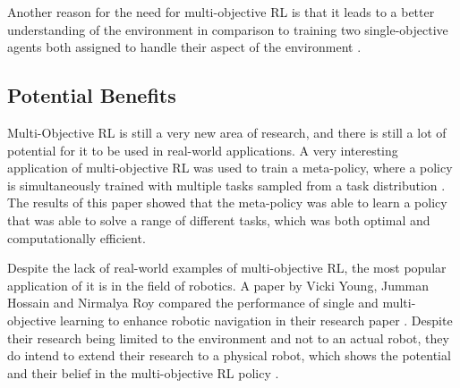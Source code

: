 Another reason for the need for multi-objective RL is that it leads to a better understanding of the environment in comparison to training two single-objective agents both assigned to handle their aspect of the environment \cite{Sutton1}. %


\subsection{Potential Benefits}

Multi-Objective RL is still a very new area of research, and there is still a lot of potential for it to be used in real-world applications. A very interesting application of multi-objective RL was used to train a meta-policy, where a policy is simultaneously trained with multiple tasks sampled from a task distribution \cite{8968092}. The results of this paper showed that the meta-policy was able to learn a policy that was able to solve a range of different tasks, which was both optimal and computationally efficient. 

Despite the lack of real-world examples of multi-objective RL, the most popular application of it is in the field of robotics. A paper by Vicki Young, Jumman Hossain and Nirmalya Roy compared the performance of single and multi-objective learning to enhance robotic navigation in their research paper \cite{young2023enhancing}. Despite their research being limited to the environment and not to an actual robot, they do intend to extend their research to a physical robot, which shows the potential and their belief in the multi-objective RL policy \cite{young2023enhancing}.